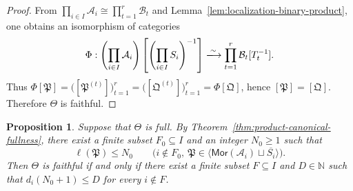 \documentclass[10pt,a4paper]{amsart}
\theoremstyle{plain}
\newtheorem{proposition}[theorem]{Proposition}
\theoremstyle{definition}
\theoremstyle{remark}
\begin{document}
\begin{proof}
  From $\prod_{i\in I}\mathcal A_i\cong\prod_{t=1}^r\mathcal B_t$ and Lemma~\ref{lem:localization-binary-product}, one obtains an isomorphism of categories
  \[
    \Phi:
    \left(\prod_{i\in I}\mathcal A_i\right)
    \left[\left(\prod_{i\in I}S_i\right)^{-1}\right]
    \xlongrightarrow{\sim}
    \prod_{t=1}^r\mathcal B_t[T_t^{-1}].
  \]
  Thus $\Phi[\mathfrak P] =\bigl([\mathfrak P^{(t)}]\bigr)_{t=1}^r =\bigl([\mathfrak Q^{(t)}]\bigr)_{t=1}^r =\Phi[\mathfrak Q]$, hence $[\mathfrak P]=[\mathfrak Q]$.
  Therefore $\Theta$ is faithful.
\end{proof}

\begin{proposition}\label{prop:faithfulness-under-fullness}
  Suppose that $\Theta$ is full.
  By Theorem~\ref{thm:product-canonical-fullness}, there exist a finite subset $F_0\subseteq I$ and an integer $N_0\geq1$ such that
  \[
    \ell(\mathfrak P)\leq N_0
    \qquad
    \bigl(i\notin F_0,\
    \mathfrak P\in
    \langle\mathsf{Mor}(\mathcal A_i)\sqcup\overline{S_i}\rangle\bigr).
  \]
  Then $\Theta$ is faithful if and only if there exist a finite subset $F\subseteq I$ and $D\in\mathbb N$ such that $d_i(N_0+1)\leq D$ for every $i\notin F$.
\end{proposition}
\end{document}
